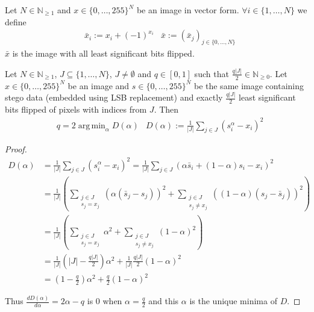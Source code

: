 \documentclass{itsarticle}
\DeclareMathOperator*{\argmin}{arg\,min}
\begin{document}
\begin{definition}
    Let $N \in \mathbb{N}_{\ge 1}$ and $x \in \{0, \dots, 255\}^N$ be an image
    in vector form. $\forall i \in \{1, \dots, N\}$ we define
    \begin{align*}
        & \bar{x}_i := x_i + (-1)^{x_i}
        & \bar{x}   := \left(\bar{x}_j\right)_{j \in \{0, \dots, N\}}
    \end{align*}
    $\bar{x}$ is the image with all least significant bits flipped.
\end{definition}

\begin{theorem}
    \label{theo:t1_parts}
    Let $N \in \mathbb{N}_{\ge 1}$, $J \subseteq \{1, \dots, N\}$, $J \neq
    \emptyset$ and $q \in \left[0, 1\right]$ such that $\frac{q |J|}{2} \in
    \mathbb{N}_{\ge 0}$. Let $x \in \{0, \dots, 255\}^N$ be an image and $s \in
    \{0, \dots, 255\}^N$ be the same image containing stego data (embedded
    using LSB replacement) and exactly $\frac{q |J|}{2}$ least significant bits
    flipped of pixels with indices from $J$.
    Then
    \begin{align*}
        & q = 2 \argmin_\alpha D(\alpha)
        & D(\alpha) := \frac{1}{|J|} \sum\limits_{j \in J} \left(s_i^\alpha - x_i\right)^2
    \end{align*}
\end{theorem}

\begin{proof}
    \begin{align*}
        D(\alpha) &= \frac{1}{|J|} \sum\limits_{j \in J} \left(s_i^\alpha - x_i\right)^2 = \frac{1}{|J|} \sum\limits_{j \in J} \left(\alpha \bar{s}_i + (1-\alpha) s_i - x_i\right)^2\\
                  &= \frac{1}{|J|} \left(\sum\limits_{\substack{j \in J\\ s_j = x_j}} \left(\alpha (\bar{s}_j - s_j)\right)^2 + \sum\limits_{\substack{j \in J\\ s_j \neq x_j}} \left((1 - \alpha) (s_j - \bar{s}_j)\right)^2 \right)\\
                  &= \frac{1}{|J|} \left(\sum\limits_{\substack{j \in J\\ s_j = x_j}} \alpha^2 + \sum\limits_{\substack{j \in J\\ s_j \neq x_j}} (1-\alpha)^2 \right)\\
                  &= \frac{1}{|J|} \left(|J| - \frac{q |J|}{2}\right) \alpha^2 + \frac{1}{|J|} \frac{q |J|}{2} (1 - \alpha)^2\\
                  &= \left(1 - \frac{q}{2}\right) \alpha^2 + \frac{q}{2} (1-\alpha)^2
    \end{align*}

    Thus $\frac{d D(\alpha)}{d\alpha} = 2 \alpha - q $ is $0$ when $\alpha =
    \frac{q}{2}$ and this $\alpha$ is the unique minima of $D$.
\end{proof}
\end{document}
